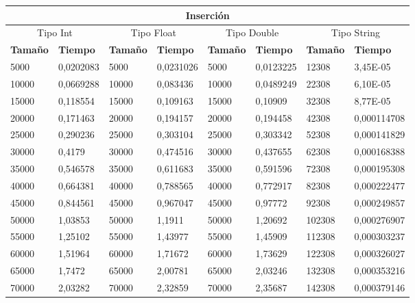 \documentclass[11pt,openany]{book}
\begin{document}
\begin{table}[!ht]
    \centering
    \small
    \begin{tabular}{|l|l|l|l|l|l|l|l|}
    \hline
    \multicolumn{8}{|c|}{\cellcolor{blue!20}\textbf{Inserción}} \\ \hline
    \multicolumn{2}{|c|}{\cellcolor{gray!20}Tipo Int} & \multicolumn{2}{c|}{\cellcolor{gray!20}Tipo Float} & \multicolumn{2}{c|}{\cellcolor{gray!20}Tipo Double} & \multicolumn{2}{c|}{\cellcolor{gray!20}Tipo String}\\ \hline
        \textbf{Tamaño} & \textbf{Tiempo} & \textbf{Tamaño} & \textbf{Tiempo} & \textbf{Tamaño} & \textbf{Tiempo} & \textbf{Tamaño} & \textbf{Tiempo} \\ \hline
        5000 & 0,0202083 & 5000 & 0,0231026 & 5000 & 0,0123225 & 12308 & 3,45E-05 \\ \hline
        10000 & 0,0669288 & 10000 & 0,083436 & 10000 & 0,0489249 & 22308 & 6,10E-05 \\ \hline
        15000 & 0,118554 & 15000 & 0,109163 & 15000 & 0,10909 & 32308 & 8,77E-05 \\ \hline
        20000 & 0,171463 & 20000 & 0,194157 & 20000 & 0,194458 & 42308 & 0,000114708 \\ \hline
        25000 & 0,290236 & 25000 & 0,303104 & 25000 & 0,303342 & 52308 & 0,000141829 \\ \hline
        30000 & 0,4179 & 30000 & 0,474516 & 30000 & 0,437655 & 62308 & 0,000168388 \\ \hline
        35000 & 0,546578 & 35000 & 0,611683 & 35000 & 0,591596 & 72308 & 0,000195308 \\ \hline
        40000 & 0,664381 & 40000 & 0,788565 & 40000 & 0,772917 & 82308 & 0,000222477 \\ \hline
        45000 & 0,844561 & 45000 & 0,967047 & 45000 & 0,97772 & 92308 & 0,000249857 \\ \hline
        50000 & 1,03853 & 50000 & 1,1911 & 50000 & 1,20692 & 102308 & 0,000276907 \\ \hline
        55000 & 1,25102 & 55000 & 1,43977 & 55000 & 1,45909 & 112308 & 0,000303237 \\ \hline
        60000 & 1,51964 & 60000 & 1,71672 & 60000 & 1,73629 & 122308 & 0,000326027 \\ \hline
        65000 & 1,7472 & 65000 & 2,00781 & 65000 & 2,03246 & 132308 & 0,000353216 \\ \hline
        70000 & 2,03282 & 70000 & 2,32859 & 70000 & 2,35687 & 142308 & 0,000379146 \\ \hline

\end{tabular}
\end{table}
\end{document}
